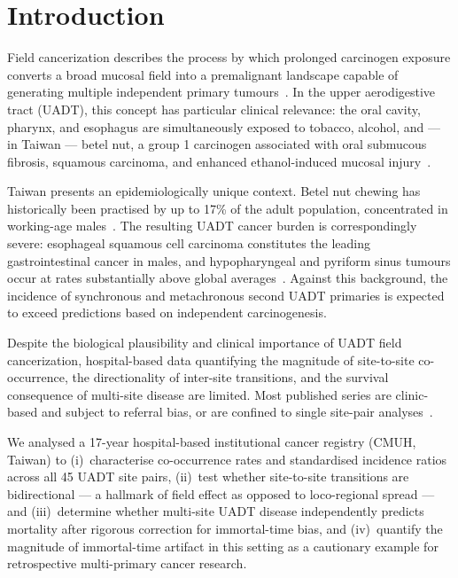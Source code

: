 \documentclass[12pt,a4paper]{article}
\begin{document}
\section{Introduction}

Field cancerization describes the process by which prolonged carcinogen exposure
converts a broad mucosal field into a premalignant landscape capable of generating
multiple independent primary tumours~\citep{slaughter1953}.
In the upper aerodigestive tract (UADT), this concept has particular clinical
relevance: the oral cavity, pharynx, and esophagus are simultaneously exposed
to tobacco, alcohol, and — in Taiwan — betel nut, a group 1 carcinogen
associated with oral submucous fibrosis, squamous carcinoma, and enhanced
ethanol-induced mucosal injury~\citep{who2004betel,lin2005}.

Taiwan presents an epidemiologically unique context. Betel nut chewing has
historically been practised by up to 17\% of the adult population, concentrated
in working-age males~\citep{chen2003}. The resulting UADT cancer burden is
correspondingly severe: esophageal squamous cell carcinoma constitutes the
leading gastrointestinal cancer in males, and hypopharyngeal and pyriform
sinus tumours occur at rates substantially above global averages~\citep{chen2008}.
Against this background, the incidence of synchronous and metachronous second
UADT primaries is expected to exceed predictions based on independent carcinogenesis.

Despite the biological plausibility and clinical importance of UADT field
cancerization, hospital-based data quantifying the magnitude of
site-to-site co-occurrence, the directionality of inter-site transitions,
and the survival consequence of multi-site disease are limited. Most published
series are clinic-based and subject to referral bias, or are confined to single
site-pair analyses~\citep{haughey1992,sturgis2004,schwartz2007}.

We analysed a 17-year hospital-based institutional cancer registry (CMUH, Taiwan) to
(i)~characterise co-occurrence rates and standardised incidence ratios across
all 45 UADT site pairs, (ii)~test whether site-to-site transitions are
bidirectional — a hallmark of field effect as opposed to loco-regional spread —
and (iii)~determine whether multi-site UADT disease independently predicts
mortality after rigorous correction for immortal-time bias, and
(iv)~quantify the magnitude of immortal-time artifact in this setting
as a cautionary example for retrospective multi-primary cancer research.
\end{document}
